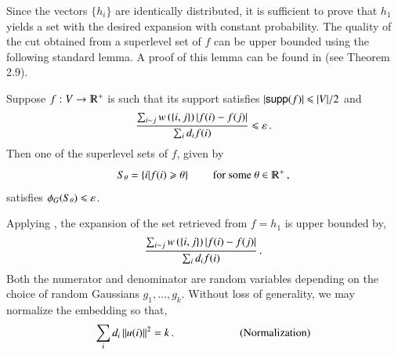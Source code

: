 \documentclass[11pt]{article}
\begin{document}
Since the vectors $\{h_i\}$ are identically distributed, it is
sufficient to prove that $h_1$ yields a set with the desired expansion
with constant probability.
%
%
%
%
The quality of the  cut obtained from a superlevel set of $f$ can be upper bounded
using the following standard lemma. A proof of this lemma
 can be found in \cite{chung97} (see Theorem 2.9).
 \begin{lemma}
\label{lem:level}
Suppose $f : V \to \R^+$ is such that its support satisfies $\left\lvert{\sf supp}(f)\right\rvert \leqslant |V|/2$ and 
\[ \frac{ \sum_{i \sim j} w \left(\left\{i,j\right\} \right ) \left\lvert f(i) - f(j)\right\rvert }{
\sum_i d_i f(i)  }  \leqslant \varepsilon \,. \]
Then one of the superlevel sets of $f$, given by  
$$S_\theta = \{ i | f(i) \geq \theta \} \qquad \text{ for some }
\theta \in \R^+ \mcom$$ 
satisfies $\phi_G(S_\theta) \leqslant \varepsilon$.
\end{lemma}
Applying , the expansion of the set retrieved from $f = h_1$ is upper bounded by,
\begin{equation} \label{eq:ray-of-f}
  \frac{\sum_{i \sim j } w\left(\left\{i,j\right\} \right )  \left\lvert f(i) -
f(j)\right\rvert}{\sum_{i} d_i f(i)} \,. 
\end{equation}
Both the numerator and denominator are random variables depending on
the choice of random Gaussians $g_1,\ldots,g_k$.  
Without loss of generality, we may normalize the embedding so that,
\begin{align}
\label{eq:vec-scaling}
 \sum_i d_i \left\lVert u(i)\right\rVert^2 = k \,. \qquad \qquad \qquad
 \text{(Normalization)}  
\end{align}
\end{document}
